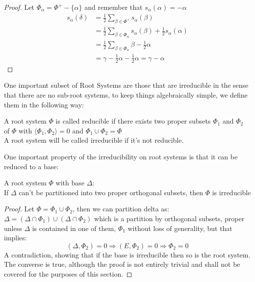 \begin{proof}
	Let $\Phi_\alpha = \Phi^+-\{\alpha\}$ and remember that $s_\alpha(\alpha)=-\alpha$
	\begin{align*}
		s_\alpha(\delta) &= \displaystyle \frac{1}{2}\sum_{\beta \in \Phi^+} s_\alpha(\beta)\\
		&= \displaystyle \frac{1}{2}\sum_{\beta \in \Phi_\alpha}  s_\alpha(\beta) + \frac{1}{2}s_\alpha(\alpha)\\
		&= \frac{1}{2}\sum_{\beta \in \Phi_\alpha} \beta - \frac{1}{2}\alpha\\
		&= \gamma - \frac{1}{2}\alpha - \frac{1}{2} \alpha = \gamma-\alpha
	\end{align*}
\end{proof}

One important subset of Root Systems are those that are irreducible in the sense that there are no sub-root systems, to keep things algebraically simple, we define them in the following way:
\begin{defi}
	\label{irredRS}
	A root system $\Phi$ is called reducible if there exists two proper subsets $\Phi_1$ and $\Phi_2$ of $\Phi$ with $\langle \Phi_1,\Phi_2 \rangle = 0$ and $\Phi_1 \cup \Phi_2 = \Phi$\\
	A root system will be called irreducible if it's not reducible.
\end{defi}
One important property of the irreducibility on root systems is that it can be reduced to a base:
\begin{prop}
	A root system $\Phi$ with base $\Delta$:\\
	If $\Delta$ can't be partitioned into two proper orthogonal subsets, then $\Phi$ is irreducible
	\label{irbaseimplyirroot}
\end{prop}
\begin{proof}
	Let $\Phi = \Phi_1 \cup \Phi_2$, then we can partition delta as: $\Delta = (\Delta \cap \Phi_1) \cup (\Delta \cap \Phi_2)$ which is a partition by orthogonal subsets, proper unless $\Delta$ is contained in one of them,  $\Phi_1$ without loss of generality, but that implies:
	$$(\Delta,\Phi_2) = 0 \Rightarrow (E,\Phi_2) = 0 \Rightarrow \Phi_2 = 0$$
	A contradiction, showing that if the base is irreducible then so is the root system.\\
	The converse is true, although the proof is not entirely trivial and shall not be covered for the purposes of this section.
\end{proof}